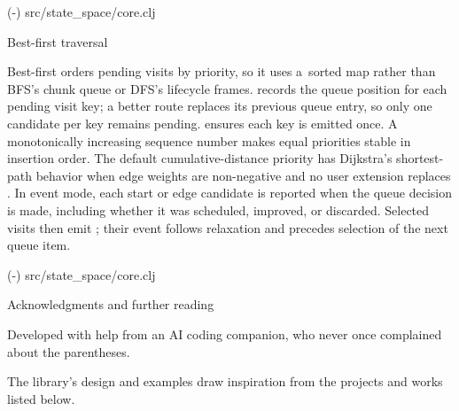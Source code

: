 {\begingroup
\typosize[8/9]
\verbinput {} (\the\sourcefirstline-\the\sourcelastline) src/state_space/core.clj
\endgroup

\secc Best-first traversal

Best-first orders pending visits by priority, so it uses a~sorted map rather
than BFS's chunk queue or DFS's lifecycle frames.  records the
queue position for each pending visit key; a better route replaces its
previous queue entry, so only one candidate per key remains pending.
 ensures each key is emitted once. A monotonically increasing
sequence number makes equal priorities stable in insertion order. The default
cumulative-distance priority has Dijkstra's shortest-path behavior when edge
weights are non-negative and no user extension replaces .
In event mode, each start or edge candidate is reported when the queue
decision is made, including whether it was scheduled, improved, or discarded.
Selected visits then emit ; their  event follows
relaxation and precedes selection of the next queue item.

\begingroup
\typosize[8/9]
\verbinput {} (\the\sourcefirstline-\the\sourcelastline) src/state_space/core.clj
\endgroup

\sec Acknowledgments and further reading

Developed with help from an AI coding companion, who never once complained
about the parentheses.~

The library's design and examples draw inspiration from the projects and
works listed below.

}
